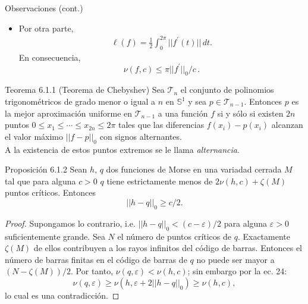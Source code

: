 \documentclass{beamer}
\begin{document}
\begin{frame}{Observaciones (cont.)}
\begin{itemize}
\item Por otra parte,
\begin{gather*}
\ell(f)=\frac{1}{2}\int_{0}^{2\pi}||f^\prime(t)||\,dt.
\end{gather*}
En consecuencia, $$\nu(f,c)\leq \pi ||f^\prime||_{0}/c\,.$$
\end{itemize}
\end{frame}

\begin{frame}
\begin{block}{Teorema 6.1.1 (Teorema de Chebyshev)} Sea $\mathcal{T}_n$ el conjunto de polinomios trigonom\'etricos de grado menor o igual a $n$ en $\mathbb{S}^1$ y sea $p\in\mathcal{T}_{n-1}$. Entonces $p$ es la mejor aproximaci\'on uniforme en $\mathcal{T}_{n-1}$ a una funci\'on $f$ si y s\'olo si existen $2n$ puntos $0\leq x_1\leq \cdots\leq x_{2n}\leq 2\pi$ tales que las diferencias $f(x_i)-p(x_i)$ alcanzan el valor m\'aximo $||f-p||_0$ con signos alternantes.\\
\vspace{1em}
A la existencia de estos puntos extremos se le llama \emph{alternancia}.
\end{block}
\end{frame}

\begin{frame}
\begin{block}{Proposici\'on 6.1.2}
Sean $h,\,q$ dos funciones de Morse en una variadad cerrada $M$ tal que para alguna $c>0$ $q$ tiene estrictamente menos de $2\nu(h,c)+\zeta(M)$ puntos cr\'iticos. Entonces $$||h-q||_0\geq c/2.$$
\end{block}
\begin{proof}
Supongamos lo contrario, i.e. $||h-q||_0<(c-\varepsilon)/2$ para alguna $\varepsilon >0$ suficientemente grande. Sea $N$ el n\'umero de puntos cr\'iticos de $q$. Exactamente $\zeta(M)$ de ellos contribuyen a los rayos infinitos del c\'odigo de barras. Entonces el n\'umero de barras finitas en el c\'odigo de barras de $q$ no puede ser mayor a $(N-\zeta(M))/2$. Por tanto, $\nu(q,\varepsilon)<\nu(h,c)$; sin embargo por la ec. 24: $$\nu(q,\varepsilon)\geq \nu(h,\varepsilon+2||h-q||_0)\geq \nu(h,c),$$ lo cual es una contradicci\'on.
\end{proof}
\end{frame}
\end{document}
